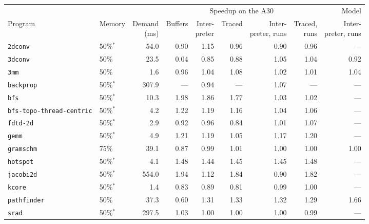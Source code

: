 \begin{tabular}{llrrrrrrr}
\toprule
 & & & \multicolumn{5}{c}{Speedup on the A30} & Model \\
\cmidrule(lr){4-8} \cmidrule(lr){9-9}
Program & Memory & \shortstack{Demand\\(ms)} & Buffers & \shortstack{Inter-\\preter} & Traced & \shortstack{Inter-\\preter, runs} & \shortstack{Traced,\\runs} & \shortstack{Inter-\\preter, runs} \\
\midrule
\texttt{2dconv} & 50\%$^*$ & 54.0 & 0.90 & 1.15 & 0.96 & 0.90 & 0.96 & --- \\
\texttt{3dconv} & 50\% & 23.5 & 0.04 & 0.85 & 0.88 & 1.05 & 1.04 & 0.92 \\
\texttt{3mm} & 50\% & 1.6 & 0.96 & 1.04 & 1.08 & 1.02 & 1.01 & 1.04 \\
\texttt{backprop} & 50\%$^*$ & 307.9 & --- & 0.94 & --- & 1.07 & --- & --- \\
\texttt{bfs} & 50\%$^*$ & 10.3 & 1.98 & 1.86 & 1.77 & 1.03 & 1.02 & --- \\
\texttt{bfs-topo-thread-centric} & 50\%$^*$ & 4.2 & 1.22 & 1.19 & 1.16 & 1.04 & 1.06 & --- \\
\texttt{fdtd-2d} & 50\%$^*$ & 2.9 & 0.92 & 0.96 & 0.84 & 1.01 & 1.07 & --- \\
\texttt{gemm} & 50\%$^*$ & 4.9 & 1.21 & 1.19 & 1.05 & 1.17 & 1.20 & --- \\
\texttt{gramschm} & 75\% & 39.1 & 0.87 & 0.99 & 1.01 & 1.00 & 1.00 & 1.00 \\
\texttt{hotspot} & 50\%$^*$ & 4.1 & 1.48 & 1.44 & 1.45 & 1.45 & 1.48 & --- \\
\texttt{jacobi2d} & 50\%$^*$ & 554.0 & 1.94 & 1.12 & 1.84 & 0.90 & 1.82 & --- \\
\texttt{kcore} & 50\%$^*$ & 1.4 & 0.83 & 0.89 & 0.81 & 0.99 & 1.00 & --- \\
\texttt{pathfinder} & 50\% & 37.3 & 0.60 & 1.31 & 1.33 & 1.32 & 1.29 & 1.66 \\
\texttt{srad} & 50\%$^*$ & 297.5 & 1.03 & 1.00 & 1.00 & 1.00 & 0.99 & --- \\
\bottomrule
\end{tabular}
